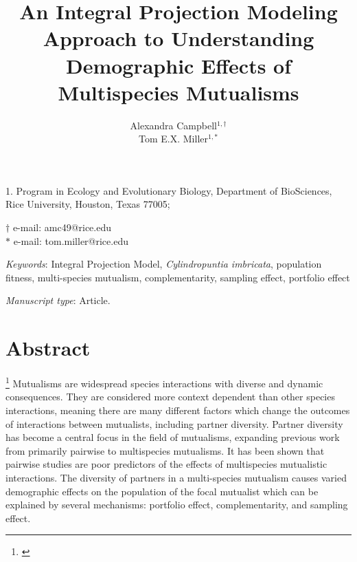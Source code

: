 \documentclass[11pt]{article}
\title{An Integral Projection Modeling Approach to Understanding Demographic Effects of Multispecies Mutualisms}
\author{Alexandra Campbell$^{1,\dagger}$ \\ 
	Tom E.X. Miller$^{1,\ast}$}
\date{}
\newcommand{\tom}[2]{{\color{red}{#1}}\footnote{\textit{\color{red}{#2}}}}
\begin{document}
	
	\maketitle
	
	\noindent{} 1. Program in Ecology and Evolutionary Biology, Department of BioSciences, Rice University, Houston, Texas 77005;
	
	\noindent{} $\dagger$ e-mail: amc49@rice.edu\\
	\noindent{} $\ast$ e-mail: tom.miller@rice.edu
	
	\bigskip
	
	\textit{Keywords}:  Integral Projection Model, \textit{Cylindropuntia imbricata}, population fitness, multi-species mutualism, complementarity, sampling effect, portfolio effect
	
	\bigskip
	
	\textit{Manuscript type}: Article.
	
	\bigskip
	
	
\linenumbers{}
\modulolinenumbers[3]

\newpage{}

\section*{Abstract}
\tom{}{I think this is too long for Am Nat requirements. Also, use ``we''.}
Mutualisms are widespread species interactions with diverse and dynamic consequences. 
They are considered more context dependent than other species interactions, meaning there are many different factors which change the outcomes of interactions between mutualists, including partner diversity. 
Partner diversity has become a central focus in the field of mutualisms, expanding previous work from primarily pairwise to multispecies mutualisms. 
It has been shown that pairwise studies are poor predictors of the effects of multispecies mutualistic interactions. 
The diversity of partners in a multi-species mutualism causes varied demographic effects on the population of the focal mutualist which can be explained by several mechanisms: portfolio effect, complementarity, and sampling effect. 
\end{document}
